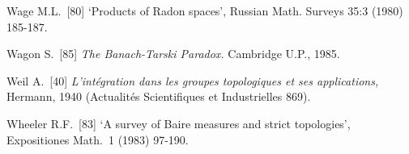 {\medskip%

Wage M.L.\ [80] `Products of Radon spaces', Russian Math. Surveys 35:3
(1980) 185-187.
\cmmnt{[\S434 {\it notes\/}.]}

Wagon S.\ [85] {\it The Banach-Tarski Paradox.}  Cambridge U.P., 1985. 
\cmmnt{[449Yj.]}

Weil A.\ [40] {\it L'int\'egration dans les groupes topologiques et ses
applications,} Hermann, 1940 (Actualit\'es Scientifiques et Industrielles 869).
\cmmnt{[445N.]}

Wheeler R.F.\ [83] `A survey of Baire measures and strict topologies',
Expositiones Math.\ 1 (1983) 97-190.



\frnewpage
}%

